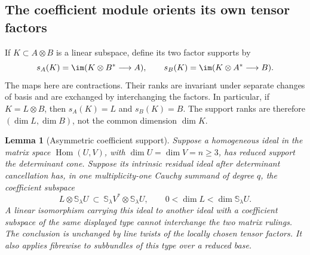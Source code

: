 \documentclass[11pt,reqno]{amsart}
\numberwithin{equation}{section}
\newtheorem{lemma}[theorem]{Lemma}
\theoremstyle{definition}\newtheorem{definition}[theorem]{Definition}
\theoremstyle{remark}\newtheorem{remark}[theorem]{Remark}
\DeclareMathOperator{\Hom}{Hom}\DeclareMathOperator{\Tot}{Tot}
\begin{document}
\subsection{The coefficient module orients its own tensor factors}
If \(K\subset A\otimes B\) is a linear subspace, define its two
factor supports by
\[
 s_A(K)=\im(K\otimes B^*\longrightarrow A),\qquad
 s_B(K)=\im(K\otimes A^*\longrightarrow B).
\]
The maps here are contractions.  Their ranks are invariant under
separate changes of basis and are exchanged by interchanging the
factors.  In particular, if \(K=L\otimes B\), then
\(s_A(K)=L\) and \(s_B(K)=B\).  The support ranks are therefore
\((\dim L,\dim B)\), not the common dimension \(\dim K\).

\begin{lemma}[Asymmetric coefficient support]
\label{lem:coefficient-orientation-v146}
Suppose a homogeneous ideal in the matrix space \(\Hom(U,V)\), with
\(\dim U=\dim V=n\ge3\), has reduced support the determinant cone.
Suppose its intrinsic residual ideal after determinant cancellation
has, in one multiplicity-one Cauchy summand of degree \(q\), the
coefficient subspace
\[
 L\otimes\mathbb S_\lambda U
 \ \subset\ \mathbb S_\lambda V^*\otimes\mathbb S_\lambda U,
 \qquad 0<\dim L<\dim\mathbb S_\lambda U.
\]
A linear isomorphism carrying this ideal to another ideal with a
coefficient subspace of the same displayed type cannot interchange
the two matrix rulings.  The conclusion is unchanged by line twists
of the locally chosen tensor factors.  It also applies fibrewise to
subbundles of this type over a reduced base.
\end{lemma}
\end{document}
